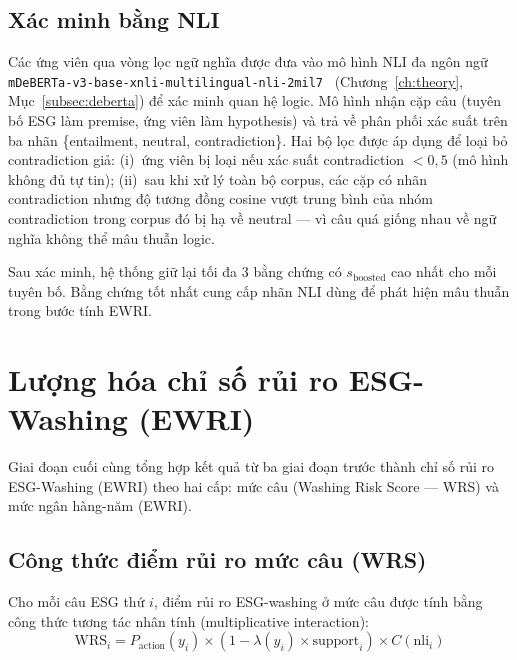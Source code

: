 \subsection{Xác minh bằng NLI}
\label{subsec:nli_verification}

Các ứng viên qua vòng lọc ngữ nghĩa được đưa vào mô hình NLI đa ngôn ngữ \texttt{mDeBERTa-v3-base-xnli-multilingual-nli-2mil7}~\cite{laurer2023building} (Chương~\ref{ch:theory}, Mục~\ref{subsec:deberta}) để xác minh quan hệ logic. Mô hình nhận cặp câu (tuyên bố ESG làm premise, ứng viên làm hypothesis) và trả về phân phối xác suất trên ba nhãn \{entailment, neutral, contradiction\}. Hai bộ lọc được áp dụng để loại bỏ contradiction giả: (i)~ứng viên bị loại nếu xác suất contradiction $< 0{,}5$ (mô hình không đủ tự tin); (ii)~sau khi xử lý toàn bộ corpus, các cặp có nhãn contradiction nhưng độ tương đồng cosine vượt trung bình của nhóm contradiction trong corpus đó bị hạ về neutral --- vì câu quá giống nhau về ngữ nghĩa không thể mâu thuẫn logic.


Sau xác minh, hệ thống giữ lại tối đa 3 bằng chứng có $s_{\text{boosted}}$ cao nhất cho mỗi tuyên bố. Bằng chứng tốt nhất cung cấp nhãn NLI dùng để phát hiện mâu thuẫn trong bước tính EWRI.


\section{Lượng hóa chỉ số rủi ro ESG-Washing (EWRI)}
\label{sec:ewri_method}

Giai đoạn cuối cùng tổng hợp kết quả từ ba giai đoạn trước thành chỉ số rủi ro ESG-Washing (EWRI) theo hai cấp: mức câu (Washing Risk Score --- WRS) và mức ngân hàng-năm (EWRI).


\subsection{Công thức điểm rủi ro mức câu (WRS)}
\label{subsec:ewri_formula}

Cho mỗi câu ESG thứ $i$, điểm rủi ro ESG-washing ở mức câu được tính bằng công thức tương tác nhân tính (multiplicative interaction):
\begin{equation}
    \text{WRS}_i = P_{\text{action}}(y_i) \times \left(1 - \lambda(y_i) \times \text{support}_i\right) \times C(\text{nli}_i)
    \label{eq:wrs}
\end{equation}

